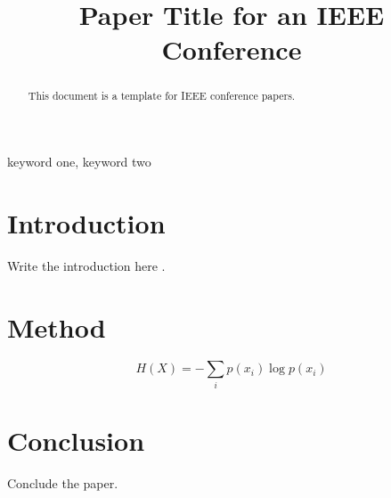 \documentclass[conference]{IEEEtran}
\begin{document}
\title{Paper Title for an IEEE Conference}

\author{
}

\maketitle

\begin{abstract}
This document is a template for IEEE conference papers.
\end{abstract}

\begin{IEEEkeywords}
keyword one, keyword two
\end{IEEEkeywords}

\section{Introduction}
Write the introduction here \cite{shannon1948}.

\section{Method}
\begin{equation}
  H(X) = -\sum_{i} p(x_i)\log p(x_i)
\end{equation}

\section{Conclusion}
Conclude the paper.



\end{document}
